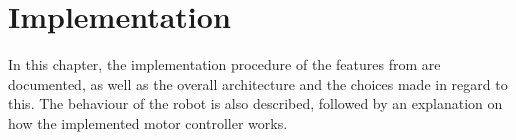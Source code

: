 \chapter{Implementation} \label{cha:implementation}

In this chapter, the implementation procedure of the features from  are documented, as well as the overall architecture and the choices made in regard to this. The behaviour of the robot is also described, followed by an explanation on how the implemented motor controller works.








% 





%
%
%

%
